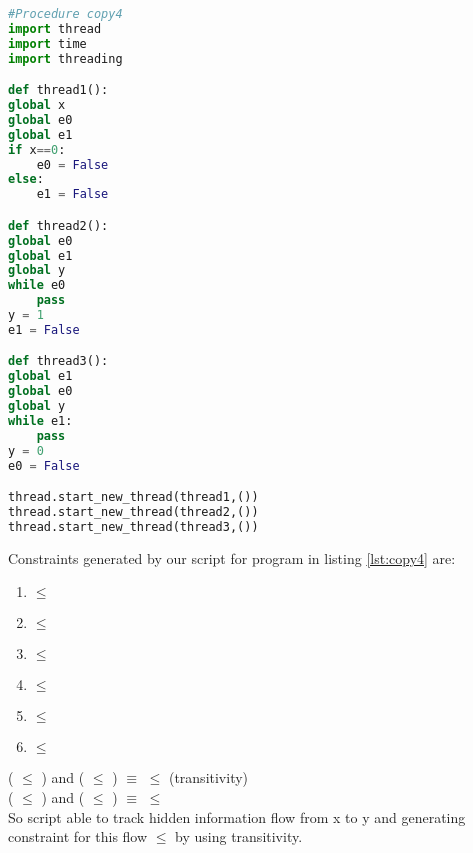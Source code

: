 \begin{lstlisting}[language=Python, caption=Python version of copy4 example in \cite{denning}. goal: information flow from x to y, label={lst:copy4} ]
#Procedure copy4
import thread
import time
import threading

def thread1():
global x
global e0
global e1
if x==0:
	e0 = False
else:
	e1 = False

def thread2(): 
global e0
global e1
global y
while e0
	pass
y = 1
e1 = False

def thread3():
global e1
global e0
global y
while e1:
	pass
y = 0
e0 = False

thread.start_new_thread(thread1,())
thread.start_new_thread(thread2,())
thread.start_new_thread(thread3,())\end{lstlisting}

Constraints generated by our script for program in listing \ref{lst:copy4} are:
\begin{enumerate}
	\item {} $\leqslant$ 
	\item {} $\leqslant$ 
	\item {} $\leqslant$ 
	\item {} $\leqslant$ 
	\item {} $\leqslant$ 
	\item {} $\leqslant$ 
\end{enumerate}
( $\leqslant$  ) and ( $\leqslant$ ) \hspace{1cm} $\equiv$ \hspace{1cm}  $\leqslant$  (transitivity)\\
( $\leqslant$  ) and ( $\leqslant$ ) \hspace{1cm} $\equiv$ \hspace{1cm}  $\leqslant$ \\
So script able to track hidden information flow from x to y and generating constraint for this flow  $\leqslant$  by using transitivity.
